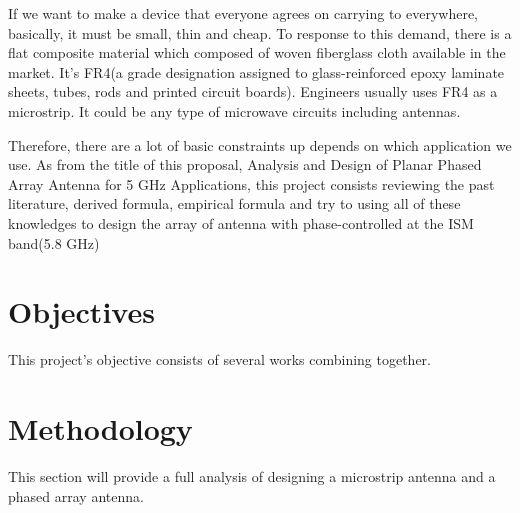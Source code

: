 \documentclass[11pt,a4paper]{article}
\begin{document}
    \indent If we want to make a device that everyone agrees on carrying to everywhere, basically, it must be small, thin and cheap.
            To response to this demand, there is a flat composite material which composed of woven fiberglass cloth available in the market.
            It's FR4(a grade designation assigned to glass-reinforced epoxy laminate sheets, tubes, rods and printed circuit boards).
            Engineers usually uses FR4 as a microstrip. It could be any type of microwave circuits including antennas.
    
    \indent Therefore, there are a lot of basic constraints up depends on which application we use. As from the title of this proposal,
            Analysis and Design of Planar Phased Array Antenna for 5 GHz Applications, this project consists reviewing the
            past literature, derived formula, empirical formula and try to using all of these knowledges to design the array of antenna with
            phase-controlled at the ISM band(5.8 GHz)
             
  \section{Objectives}
    \indent This project's objective consists of several works combining together.  

  \newpage
  
  \section{Methodology}
    \indent This section will provide a full analysis of designing a microstrip antenna and a phased array antenna.
\end{document}
